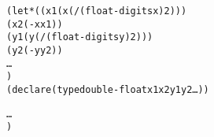 \documentclass[../Example-Program.tex]{subfiles}
\begin{document}
\begin{alltt}
   (let* ((x1 ( x (/ (float-digits x) 2)))
          (x2 (- x x1))
          (y1 ( y (/ (float-digits y) 2)))
          (y2 (- y y2))
          \ldots
          )
     (declare (type double-float x1 x2 y1 y2 \ldots))

     \ldots
     )
\end{alltt}
\end{document}
